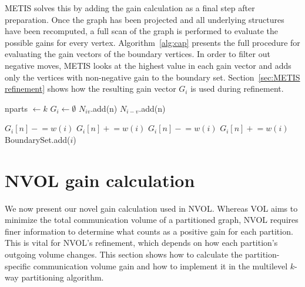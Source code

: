 METIS solves this by adding the gain calculation as a final step after preparation. Once the graph has been projected and all underlying structures have been recomputed, a full scan of the graph is performed to evaluate the possible gains for every vertex. Algorithm~\ref{alg:cap} presents the full procedure for evaluating the gain vectors of the boundary vertices. In order to filter out negative moves, METIS looks at the highest value in each gain vector and adds only the vertices with non-negative gain to the boundary set. Section~\ref{sec:METIS refinement} shows how the resulting gain vector $G_i$ is used during refinement.

\begin{algorithm}[H]
	\caption{VOL gain calculation}\label{alg:cap}
	\begin{algorithmic}
		\State nparts $\gets k$ 							
			\State $G_i \gets \emptyset$					
													
									
							\State $N_{iv}$.add(n)					
							\State $N_{i-v}$.add(n)					
						\EndIf
					\EndFor
		
							\State $G_i[n] \mathrel{-}= w(i)$				
						\EndFor
							\State $G_i[n] \mathrel{+}= w(i)$				
						\EndFor
							\State $G_i[n] \mathrel{-}= w(i)$				
						\EndFor
					\EndIf
				\EndFor	
						\State $G_i[n] \mathrel{+}= w(i)$				
					\EndFor
				\EndIf
					\State BoundarySet.add($i$)			
				\EndIf
			\EndIf
		\EndFor	
	\end{algorithmic}
\end{algorithm}

\section{NVOL gain calculation} \label{Partition specific gain calculation}
We now present our novel gain calculation used in NVOL. Whereas VOL aims to minimize the total communication volume of a partitioned graph, NVOL requires finer information to determine what counts as a positive gain for each partition. This is vital for NVOL's refinement, which depends on how each partition's outgoing volume changes. This section shows how to calculate the partition-specific communication volume gain and how to implement it in the multilevel $k$-way partitioning algorithm.


